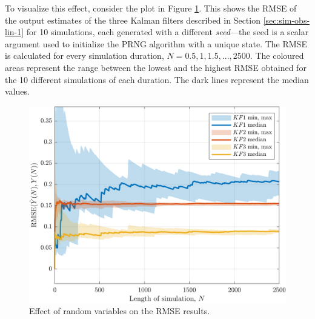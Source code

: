 To visualize this effect, consider the plot in Figure \ref{fig:rod-obs-sim-1-3KF-seed-crmse-statsplot}. This shows the \gls{RMSE} of the output estimates of the three Kalman filters described in Section \ref{sec:sim-obs-lin-1} for 10 simulations, each generated with a different \textit{seed}—the seed is a scalar argument used to initialize the \gls{PRNG} algorithm with a unique state. The \gls{RMSE} is calculated for every simulation duration, $N=0.5,1,1.5,...,2500$. The coloured areas represent the range between the lowest and the highest \gls{RMSE} obtained for the 10 different simulations of each duration. The dark lines represent the median values.

\begin{figure}[htp]
	\centering
	\includegraphics[width=14cm]{images/rod_obs_sim1_3KF_seed_crmse_statsplot.png}  %
	\caption{Effect of random variables on the \acrshort{RMSE} results.}
	\label{fig:rod-obs-sim-1-3KF-seed-crmse-statsplot}
\end{figure}  %

